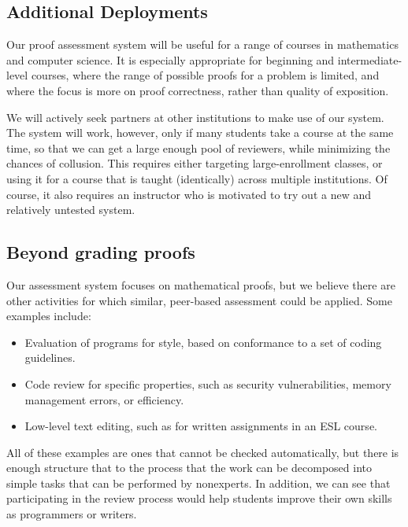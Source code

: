 \documentclass[12pt]{article}
\begin{document}
\subsection{Additional Deployments}

Our proof assessment system will be useful for a range of courses in
mathematics and computer science.  It is especially appropriate for
beginning and intermediate-level courses, where the range of possible
proofs for a problem is limited, and where the focus is more on proof
correctness, rather than quality of exposition.

We will actively seek partners at other institutions to make use of
our system.  The system will work, however, only if many students take
a course at the same time, so that we can get a large enough pool of
reviewers, while minimizing the chances of collusion.  This requires
either targeting large-enrollment classes, or using it for a course
that is taught (identically) across multiple institutions.  Of course,
it also requires an instructor who is motivated to try
out a new and relatively untested system.

\subsection{Beyond grading proofs}

Our assessment system focuses on mathematical proofs, but we believe
there are other activities for which similar, peer-based assessment
could be applied.  Some examples include:
\begin{itemize}
\item
Evaluation of programs for style, based on conformance to a set of
coding guidelines.

\item
Code review for specific properties, such as security vulnerabilities,
memory management errors, or efficiency.

\item
Low-level text editing, such as for written assignments in an ESL course.
\end{itemize}

All of these examples are ones that cannot be checked automatically,
but there is enough structure that to the process that the work can be
decomposed into simple tasks that can be performed by nonexperts.  In
addition, we can see that participating in the review process would
help students improve their own skills as programmers or writers.
\end{document}
